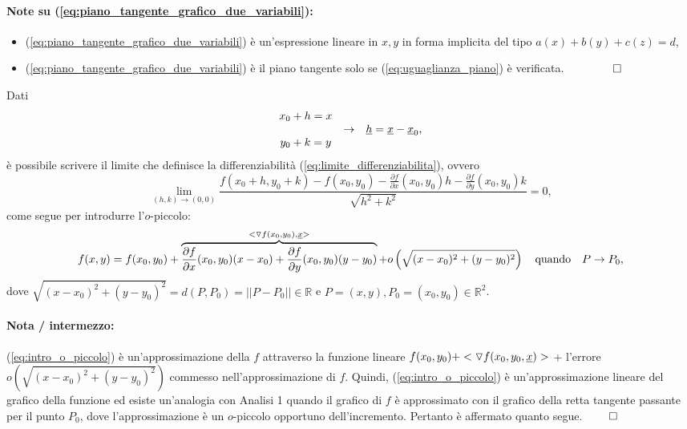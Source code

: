 \paragraph{Note su (\ref{eq:piano_tangente_grafico_due_variabili}):} \begin{itemize}
	\item (\ref{eq:piano_tangente_grafico_due_variabili}) è un'espressione lineare in $x,y$ in forma implicita del tipo $a(x) + b(y) + c(z) = d$,
	\item (\ref{eq:piano_tangente_grafico_due_variabili}) è il piano tangente solo se (\ref{eq:uguaglianza_piano}) è verificata. $\qquad\boldsymbol\qed$
\end{itemize}

\noindent Dati
\begin{equation*}
	\begin{matrix}
		x_0 + h = x &&\\
		&\rightarrow& \uline h=\uline x-\uline x_0,\\
		y_0 + k = y
	\end{matrix}
\end{equation*}
è possibile scrivere il limite che definisce la differenziabilità (\ref{eq:limite_differenziabilita}), ovvero
\begin{equation*}
	\lim\limits_{(h,k)\rightarrow (0,0)}\frac{f(x_0 + h, y_0 + k) - f(x_0, y_0) -  \frac{\partial f}{\partial x}(x_0, y_0)h - \frac{\partial f}{\partial y}(x_0, y_0)k}{\sqrt{h^2+k^2}} = 0,
\end{equation*}
come segue per introdurre l'$o$-piccolo:
\begin{equation}\label{eq:intro_o_piccolo}
	f(x,y) = f(x_0, y_0) + \overbrace{\frac{\partial f}{\partial x} (x_0, y_0)(x-x_0)+ \frac{\partial f}{\partial y} (x_0,y_0) (y-y_0)}^{<\triangledown f(x_0,y_0), \uline x>}+ o\left(\sqrt{(x-x_0)^2 + (y-y_0)^2}\right)\quad\text{quando}\quad P\rightarrow P_0,
\end{equation}
dove $\sqrt{(x-x_0)^2 + (y-y_0)^2} = d(P,P_0) = ||P-P_0||\in\mathbb{R}$ e $P=(x,y),P_0=(x_0,y_0)\in\mathbb{R}^2$.

\paragraph{Nota / intermezzo:} (\ref{eq:intro_o_piccolo}) è un'approssimazione della $f$ attraverso la funzione lineare $f(x_0,y_0) + <\triangledown f(x_0,y_0, \uline x)>$ + l'errore $o(\sqrt{(x-x_0)^2 + (y-y_0)^2})$ commesso nell'approssimazione di $f$. Quindi, (\ref{eq:intro_o_piccolo}) è un'approssimazione lineare del grafico della funzione ed esiste un'analogia con Analisi 1 quando il grafico di $f$ è approssimato con il grafico della retta tangente passante per il punto $P_0$, dove l'approssimazione è un $o$-piccolo opportuno dell'incremento. Pertanto è affermato quanto segue. $\qed$

